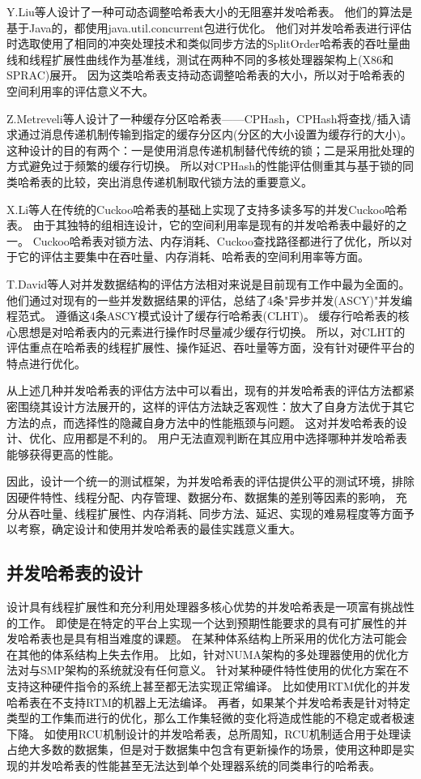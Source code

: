 Y.Liu等人设计了一种可动态调整哈希表大小的无阻塞并发哈希表\cite{nonblocking}。
他们的算法是基于Java的，都使用java.util.concurrent包进行优化。
他们对并发哈希表进行评估时选取使用了相同的冲突处理技术和类似同步方法的SplitOrder哈希表\cite{shalev2006split}的吞吐量曲线和线程扩展性曲线作为基准线，测试在两种不同的多核处理器架构上(X86和SPRAC)展开。
因为这类哈希表支持动态调整哈希表的大小，所以对于哈希表的空间利用率的评估意义不大。

Z.Metreveli等人设计了一种缓存分区哈希表——CPHash\cite{metreveli2012cphash}，CPHash将查找/插入请求通过消息传递机制传输到指定的缓存分区内(分区的大小设置为缓存行的大小)。这种设计的目的有两个：一是使用消息传递机制替代传统的锁；二是采用批处理的方式避免过于频繁的缓存行切换。
所以对CPHash的性能评估侧重其与基于锁的同类哈希表的比较，突出消息传递机制取代锁方法的重要意义。

X.Li等人在传统的Cuckoo哈希表的基础上实现了支持多读多写的并发Cuckoo哈希表\cite{cuckoo}。
由于其独特的组相连设计，它的空间利用率是现有的并发哈希表中最好的之一。
Cuckoo哈希表对锁方法、内存消耗、Cuckoo查找路径都进行了优化，所以对于它的评估主要集中在吞吐量、内存消耗、哈希表的空间利用率等方面。

T.David等人对并发数据结构的评估方法相对来说是目前现有工作中最为全面的\cite{clht}。
他们通过对现有的一些并发数据结果的评估，总结了4条"异步并发(ASCY)"并发编程范式。
遵循这4条ASCY模式设计了缓存行哈希表(CLHT)。
缓存行哈希表的核心思想是对哈希表内的元素进行操作时尽量减少缓存行切换。
所以，对CLHT的评估重点在哈希表的线程扩展性、操作延迟、吞吐量等方面，没有针对硬件平台的特点进行优化。

从上述几种并发哈希表的评估方法中可以看出，现有的并发哈希表的评估方法都紧密围绕其设计方法展开的，这样的评估方法缺乏客观性：放大了自身方法优于其它方法的点，而选择性的隐藏自身方法中的性能瓶颈与问题。
这对并发哈希表的设计、优化、应用都是不利的。
用户无法直观判断在其应用中选择哪种并发哈希表能够获得更高的性能。

因此，设计一个统一的测试框架，为并发哈希表的评估提供公平的测试环境，排除因硬件特性、线程分配、内存管理、数据分布、数据集的差别等因素的影响，
充分从吞吐量、线程扩展性、内存消耗、同步方法、延迟、实现的难易程度等方面予以考察，确定设计和使用并发哈希表的最佳实践意义重大。

\subsection{并发哈希表的设计}
设计具有线程扩展性和充分利用处理器多核心优势的并发哈希表是一项富有挑战性的工作。
即使是在特定的平台上实现一个达到预期性能要求的具有可扩展性的并发哈希表也是具有相当难度的课题。
在某种体系结构上所采用的优化方法可能会在其他的体系结构上失去作用\cite{baumann2009multikernel,david}。
比如，针对NUMA架构的多处理器使用的优化方法对与SMP架构的系统就没有任何意义\cite{david}。
针对某种硬件特性使用的优化方案在不支持这种硬件指令的系统上甚至都无法实现正常编译。
比如使用RTM优化的并发哈希表在不支持RTM的机器上无法编译。
再者，如果某个并发哈希表是针对特定类型的工作集而进行的优化，那么工作集轻微的变化将造成性能的不稳定或者极速下降。
如使用RCU机制设计的并发哈希表，总所周知，RCU机制适合用于处理读占绝大多数的数据集，但是对于数据集中包含有更新操作的场景，使用这种即是实现的并发哈希表的性能甚至无法达到单个处理器系统的同类串行的哈希表\cite{urcu}。


